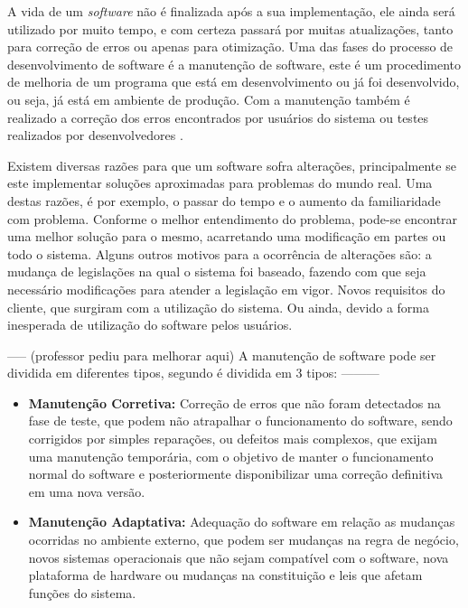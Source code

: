 A vida de um \textit{software} não é finalizada após a sua implementação, ele ainda será utilizado por muito tempo, e com certeza passará por muitas atualizações, tanto para correção de erros ou apenas para otimização. Uma das fases do processo de desenvolvimento de software é a manutenção de software, este é um procedimento de melhoria de um programa que está em desenvolvimento ou já foi desenvolvido, ou seja, já está em ambiente de produção. Com a manutenção também é realizado a correção dos erros encontrados por usuários do sistema ou testes realizados por desenvolvedores \cite{rodrigoSpinola2011}.

Existem diversas razões para que um software sofra alterações, principalmente se este implementar soluções aproximadas para problemas do mundo real. Uma destas razões, é por exemplo, o passar do tempo e o aumento da familiaridade com problema. Conforme o melhor entendimento do problema, pode-se encontrar uma melhor solução para o mesmo, acarretando uma modificação em partes ou todo o sistema. Alguns outros motivos para a ocorrência de alterações são: a mudança de legislações na qual o sistema foi baseado, fazendo com que seja necessário modificações para atender a legislação em vigor. Novos requisitos do cliente, que surgiram com a utilização do sistema. Ou ainda, devido a forma inesperada de utilização do software pelos usuários.

----- (professor pediu para melhorar aqui) A manutenção de software pode ser dividida em diferentes tipos, segundo \cite{iansommerville} é dividida em 3 tipos: ---------


\begin{itemize}
    \item \textbf{Manutenção Corretiva:} Correção de erros que não foram detectados na fase de teste, que podem não atrapalhar o funcionamento do software, sendo corrigidos por simples reparações, ou defeitos mais complexos, que exijam uma manutenção temporária, com o objetivo de manter o funcionamento normal do software e posteriormente disponibilizar uma correção definitiva em uma nova versão. 
\end{itemize}
    
\begin{itemize}  
    \item \textbf{Manutenção Adaptativa:} Adequação do software em relação as mudanças ocorridas no ambiente externo, que podem ser mudanças na regra de negócio, novos sistemas operacionais que não sejam compatível com o software, nova plataforma de hardware ou mudanças na constituição e leis que afetam funções do sistema.
\end{itemize}
    
